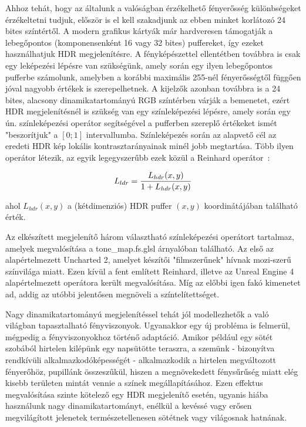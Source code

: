Ahhoz tehát, hogy az általunk a valóságban érzékelhető fényerősség különbségeket érzékeltetni tudjuk, először is el kell szakadjunk az ebben minket korlátozó 24 bites színtértől. A modern grafikus kártyák már hardveresen támogatják a lebegőpontos (komponensenként 16 vagy 32 bites) puffereket, így ezeket használhatjuk HDR megjelenítésre. A fényképészettel ellentétben továbbra is csak egy leképezési lépésre van szükségünk, amely során egy ilyen lebegőpontos pufferbe számolunk, amelyben a korábbi maximális 255-nél fényerősségtől függően jóval nagyobb értékek is szerepelhetnek. A kijelzők azonban továbbra is a 24 bites, alacsony dinamikatartományú RGB színtérben várják a bemenetet, ezért HDR megjelenítésnél is szükség van egy színleképezési lépésre, amely során egy ún. színleképezési operátor segítségével a pufferben szereplő értékeket ismét "beszorítjuk" a \([0; 1]\) intervallumba. Színleképezés során az alapvető cél az eredeti HDR kép lokális kontrasztarányainak minél jobb megtartása. Több ilyen operátor létezik, az egyik legegyszerűbb ezek közül a Reinhard operátor~\cite{reinhard2002photographic}:

\[
L_{ldr} = { L_{hdr}(x, y) \over 1 + L_{hdr}(x, y) }
\]

ahol \(L_{hdr}(x, y)\) a (kétdimenziós) HDR puffer \((x, y)\) koordinátájában található érték.

Az elkészített megjelenítő három választható színleképezési operátort tartalmaz, amelyek megvalósítása a tone\_map.fs.glsl árnyalóban található. Az első az alapértelmezett Uncharted 2, amelyet készítői "filmszerűnek" hívnak mozi-szerű színvilága miatt. Ezen kívül a fent említett Reinhard, illetve az Unreal Engine 4 alapértelmezett operátora került megvalósítása. Míg az előbbi igen fakó kimenetet ad, addig az utóbbi jelentősen megnöveli a színtelítettséget.

Nagy dinamikatartományú megjelenítéssel tehát jól modellezhetők a való világban tapasztalható fényviszonyok. Ugyanakkor egy új probléma is felmerül, mégpedig a fényviszonyokhoz történő adaptáció. Amikor például egy sötét szobából hirtelen kilépünk egy napsütötte teraszra, a szemünk - bizonyítva rendkívüli alkalmazkodóképességét - alkalmazkodik a hirtelen megváltozott fényerőhöz, pupillánk összeszűkül, hiszen a megnövekedett fénysűrűség miatt elég kisebb területen mintát vennie a színek megállapításához. Ezen effektus megvalósítása szinte kötelező egy HDR megjelenítő esetén, ugyanis hiába használunk nagy dinamikatartományt, enélkül a kevéssé vagy erősen megvilágított jelenetek természetellenesen sötétnek vagy világosnak hatnának.

